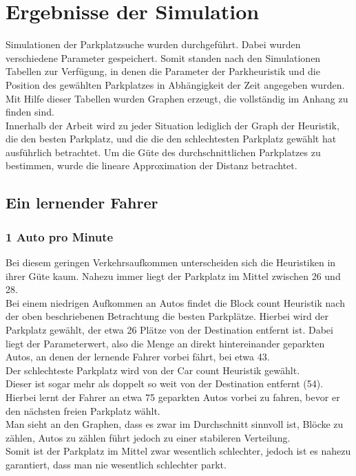 \section{Ergebnisse der Simulation}

Simulationen der Parkplatzsuche wurden durchgeführt. Dabei wurden verschiedene Parameter gespeichert. Somit standen nach den Simulationen Tabellen zur Verfügung, in denen die Parameter der Parkheuristik und die Position des gewählten Parkplatzes in Abhängigkeit der Zeit angegeben wurden. \\
Mit Hilfe dieser Tabellen wurden Graphen erzeugt, die vollständig im Anhang zu finden sind.\\
Innerhalb der Arbeit wird zu jeder Situation lediglich der Graph der Heuristik, die den besten Parkplatz, und die die den schlechtesten Parkplatz gewählt hat ausführlich betrachtet. Um die Güte des durchschnittlichen Parkplatzes zu bestimmen, wurde die lineare Approximation der Distanz betrachtet. \\
\subsection{Ein lernender Fahrer}
\subsubsection{1 Auto pro Minute}

Bei diesem geringen Verkehrsaufkommen unterscheiden sich die Heuristiken in ihrer Güte kaum. Nahezu immer liegt der Parkplatz im Mittel zwischen 26 und 28.\\
Bei einem niedrigen Aufkommen an Autos findet die Block count Heuristik nach der oben beschriebenen Betrachtung die besten Parkplätze.
Hierbei wird der Parkplatz gewählt, der etwa 26  Plätze von der Destination entfernt ist. Dabei liegt der Parameterwert, also die Menge an direkt hintereinander geparkten Autos, an denen der lernende Fahrer vorbei fährt, bei etwa 43.\\
Der schlechteste Parkplatz wird von der Car count Heuristik gewählt. \\
Dieser ist sogar mehr als doppelt so weit von der Destination entfernt (54).
Hierbei lernt der Fahrer an etwa 75 geparkten Autos vorbei zu fahren, bevor er den nächsten freien Parkplatz wählt.\\
Man sieht an den Graphen, dass es zwar im Durchschnitt sinnvoll ist, Blöcke zu zählen, Autos zu zählen führt jedoch zu einer stabileren Verteilung.\\
Somit ist der Parkplatz im Mittel zwar wesentlich schlechter, jedoch ist es nahezu garantiert, dass man nie wesentlich schlechter parkt.

